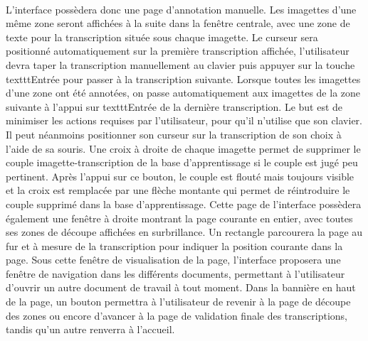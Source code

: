 \paragraph{}
L’interface possèdera donc une page d’annotation manuelle. Les imagettes d’une même zone seront affichées à la suite dans la fenêtre centrale, avec une zone de texte pour la transcription située sous chaque imagette. Le curseur sera positionné automatiquement sur la première transcription affichée, l’utilisateur devra taper la transcription manuellement au clavier puis appuyer sur la touche texttt{Entrée} pour passer à la transcription suivante. Lorsque toutes les imagettes d’une zone ont été annotées, on passe automatiquement aux imagettes de la zone suivante à l’appui sur texttt{Entrée} de la dernière transcription. Le but est de minimiser les actions requises par l’utilisateur, pour qu’il n’utilise que son clavier. Il peut néanmoins positionner son curseur sur la transcription de son choix à l’aide de sa souris.
Une croix à droite de chaque imagette permet de supprimer le couple imagette-transcription de la base d’apprentissage si le couple est jugé peu pertinent. Après l’appui sur ce bouton, le couple est flouté mais toujours visible et la croix est remplacée par une flèche montante qui permet de réintroduire le couple supprimé dans la base d’apprentissage.
Cette page de l’interface possèdera également une fenêtre à droite montrant la page courante en entier, avec toutes ses zones de découpe affichées en surbrillance. Un rectangle parcourera la page au fur et à mesure de la transcription pour indiquer la position courante dans la page.
Sous cette fenêtre de visualisation de la page, l’interface proposera une fenêtre de navigation dans les différents documents, permettant à l’utilisateur d’ouvrir un autre document de travail à tout moment.
Dans la bannière en haut de la page, un bouton permettra à l’utilisateur de revenir à la page de découpe des zones ou encore d’avancer à la page de validation finale des transcriptions, tandis qu’un autre renverra à l’accueil.


